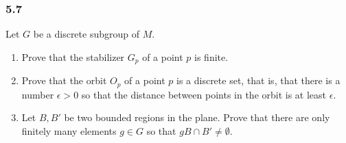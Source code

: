 \documentclass[11pt]{article}
\theoremstyle{definition}
\begin{document}
\subsubsection{5.7}
Let $G$ be a discrete subgroup of $M$.
\begin{enumerate}[label=(\alph*)]
    \item Prove that the stabilizer $G_p$ of a point $p$ is finite.

    \item Prove that the orbit $O_p$ of a point $p$ is a discrete set, that is, that there is a number $\epsilon>0$ so that the distance between points in the orbit is at least $\epsilon$.

    \item Let $B,B'$ be two bounded regions in the plane. Prove that there are only finitely many elements $g\in G$ so that $gB\cap B'\neq\emptyset$.
\end{enumerate}
\end{document}
